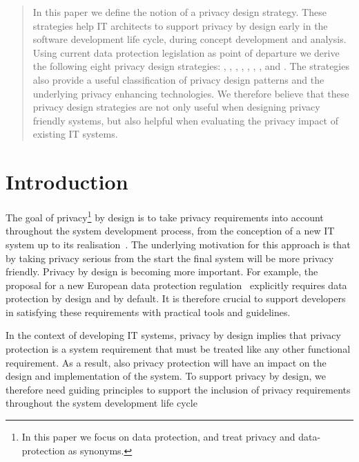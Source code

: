 
\begin{abstract}
In this paper we define the notion of a privacy design strategy. These strategies help IT architects to support privacy by design early in the software development life cycle, during concept development and analysis. Using current data protection legislation as point of departure we derive the following eight privacy design strategies: , , , , , , , and . The strategies also provide a useful classification of privacy design patterns and the underlying privacy enhancing technologies. We therefore believe that these privacy design strategies are not only useful when designing privacy friendly systems, but also helpful when evaluating the privacy impact of existing IT systems. 
\end{abstract}

\section{Introduction}


The goal of privacy\footnote{In this paper we focus on data protection, and treat privacy and
  data-protection as synonyms.
} 
by design is to take privacy requirements into account
throughout the system development process, from the conception of a new IT system up to its realisation~\cite{cavoukian2011pbd}. The underlying motivation for this approach is that by taking privacy serious from the start the final system will be more privacy friendly. Privacy by design is becoming more important. For example, the proposal for a new European data protection regulation~\cite{COM(2012)11} explicitly requires data protection by design and by default. It is therefore crucial to support developers in satisfying these requirements with practical tools and guidelines.

In the context of developing IT systems, privacy by design implies that privacy protection is a system requirement that must be treated like any other functional requirement. As a result, also privacy protection will have an impact on the design and implementation of the system. To support privacy by design, we therefore need guiding principles to support the inclusion of privacy requirements throughout the system development life cycle

